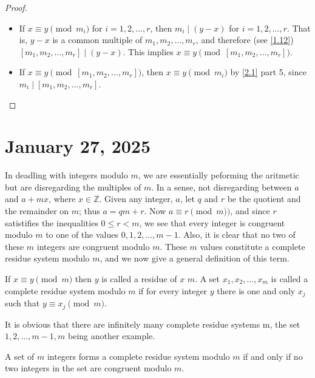 \documentclass[11pt]{article}
\begin{document}
\begin{proof}
    \begin{itemize}
        \item If \(x \equiv y \pmod{m_i}\) for \(i = 1, 2, \ldots, r\), then \(m_i \mid (y -
              x)\) for \(i = 1, 2, \ldots, r\). That is, \(y - x\) is a common multiple of
              \(m_1, m_2, \ldots, m_r\), and therefore (see \cref{1.12}) \([m_1, m_2, \ldots,
                      m_r] \mid (y - x)\). This implies \(x \equiv y \pmod{[m_1, m_2, \ldots,
                          m_r]}\).
        \item If \(x \equiv y \pmod{[m_1, m_2, \ldots, m_r]}\), then \(x \equiv y
              \pmod{m_i}\) by \cref{2.1} part 5, since \(m_i \mid [m_1, m_2, \ldots, m_r]\).
    \end{itemize}
\end{proof}
\section{January 27, 2025}
In deadling with integers modulo \(m\), we are essentially peforming the
aritmetic but are disregarding the multiples of \(m\). In a sense, not
disregarding between \(a\) and \(a + mx\), where \(x \in \mathbb{Z}\). Given
any integer, \(a\), let \(q\) and \(r\) be the quotient and the remainder on
\(m\); thus \(a = qm + r\). Now \(a \equiv r \pmod{m})\), and since \(r\)
satistifies the inequalities \(0 \leqslant r < m\), we see that every integer
is congruent modulo \(m\) to one of the values \(0, 1, 2, \ldots, m - 1\).
Also, it is clear that no two of these \(m\) integers are congruent modulo
\(m\). These \(m\) values constitute a complete residue system modulo \(m\),
and we now give a general definition of this term.

\begin{definition}
    If \(x \equiv y \pmod {m}\) then \(y\) is called a residue of \(x\)  \(m\). A set \(x_1, x_2, \ldots, x_m\) is called a complete residue system modulo \(m\) if for every integer \(y\) there is one and only \(x_j\) such that \(y \equiv x_j\pmod {m}\).
\end{definition}

It is obvious that there are infinitely many complete residue systems
 m, the set \(1, 2, \ldots, m - 1, m\) being another example.

A set of \(m\) integers forms a complete residue system modulo \(m\) if and
only if no two integers in the set are congruent modulo \(m\).
\end{document}
